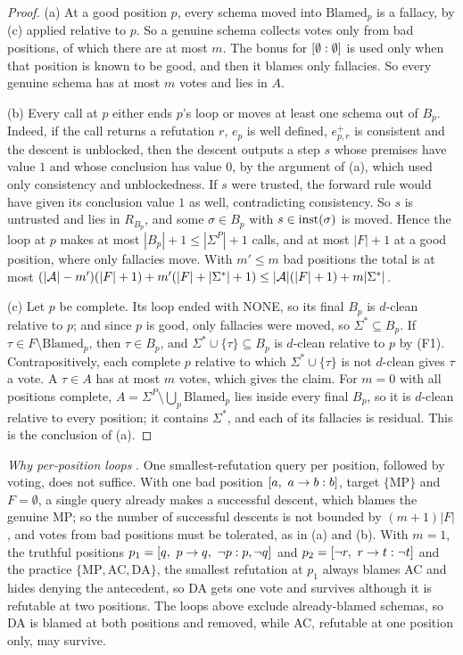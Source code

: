 \begin{proof}[Proof]
(a) At a good position $p$, every schema moved into $\mathrm{Blamed}_p$ is a fallacy, by (c) applied relative to $p$. So a genuine schema collects votes only from bad positions, of which there are at most $m$. The bonus for $[\emptyset : \emptyset]$ is used only when that position is known to be good, and then it blames only fallacies. So every genuine schema has at most $m$ votes and lies in $A$.

(b) Every call at $p$ either ends $p$'s loop or moves at least one schema out of $B_p$. Indeed, if the call returns a refutation $r$, $e_p$ is well defined, $e^+_{p,r}$ is consistent and the descent is unblocked, then the descent outputs a step $s$ whose premises have value $1$ and whose conclusion has value $0$, by the argument of (a), which used only consistency and unblockedness. If $s$ were trusted, the forward rule would have given its conclusion value $1$ as well, contradicting consistency. So $s$ is untrusted and lies in $R_{B_p}$, and some $\sigma\in B_p$ with $s\in\mathrm{inst}(\sigma)$ is moved. Hence the loop at $p$ makes at most $|B_p|+1\le|\Sigma^P|+1$ calls, and at most $|F|+1$ at a good position, where only fallacies move. With $m'\le m$ bad positions the total is at most $(|\mathcal{A}|-m')(|F|+1)+m'(|F|+|\Sigma^*|+1)\le|\mathcal{A}|(|F|+1)+m|\Sigma^*|$.

(c) Let $p$ be complete. Its loop ended with NONE, so its final $B_p$ is $d$-clean relative to $p$; and since $p$ is good, only fallacies were moved, so $\Sigma^*\subseteq B_p$. If $\tau\in F\setminus\mathrm{Blamed}_p$, then $\tau\in B_p$, and $\Sigma^*\cup\{\tau\}\subseteq B_p$ is $d$-clean relative to $p$ by (F1). Contrapositively, each complete $p$ relative to which $\Sigma^*\cup\{\tau\}$ is not $d$-clean gives $\tau$ a vote. A $\tau\in A$ has at most $m$ votes, which gives the claim. For $m=0$ with all positions complete, $A=\Sigma^P\setminus\bigcup_p\mathrm{Blamed}_p$ lies inside every final $B_p$, so it is $d$-clean relative to every position; it contains $\Sigma^*$, and each of its fallacies is residual. This is the conclusion of (a).
\end{proof}

\emph{Why per-position loops} . One smallest-refutation query per position, followed by voting, does not suffice. With one bad position $[a,\ a\to b : b]$, target $\{\mathrm{MP}\}$ and $F=\emptyset$, a single query already makes a successful descent, which blames the genuine MP; so the number of successful descents is not bounded by $(m+1)|F|$, and votes from bad positions must be tolerated, as in (a) and (b). With $m=1$, the truthful positions $p_1=\pos{q,\ p\to q,\ \neg p}{p,\neg q}$ and $p_2=[\neg r,\ r\to t : \neg t]$ and the practice $\{\mathrm{MP},\mathrm{AC},\mathrm{DA}\}$, the smallest refutation at $p_1$ always blames AC and hides denying the antecedent, so DA gets one vote and survives although it is refutable at two positions. The loops above exclude already-blamed schemas, so DA is blamed at both positions and removed, while AC, refutable at one position only, may survive.

